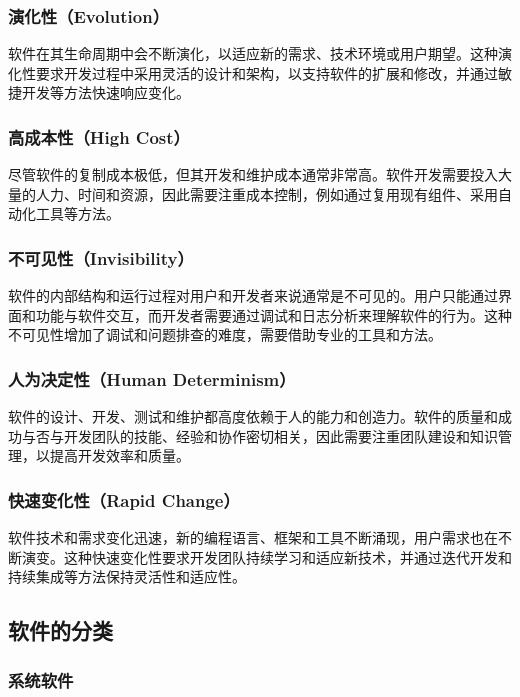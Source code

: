\subsubsection{演化性（Evolution）}

软件在其生命周期中会不断演化，以适应新的需求、技术环境或用户期望。这种演化性要求开发过程中采用灵活的设计和架构，以支持软件的扩展和修改，并通过敏捷开发等方法快速响应变化。

\subsubsection{高成本性（High Cost）}

尽管软件的复制成本极低，但其开发和维护成本通常非常高。软件开发需要投入大量的人力、时间和资源，因此需要注重成本控制，例如通过复用现有组件、采用自动化工具等方法。

\subsubsection{不可见性（Invisibility）}

软件的内部结构和运行过程对用户和开发者来说通常是不可见的。用户只能通过界面和功能与软件交互，而开发者需要通过调试和日志分析来理解软件的行为。这种不可见性增加了调试和问题排查的难度，需要借助专业的工具和方法。

\subsubsection{人为决定性（Human Determinism）}

软件的设计、开发、测试和维护都高度依赖于人的能力和创造力。软件的质量和成功与否与开发团队的技能、经验和协作密切相关，因此需要注重团队建设和知识管理，以提高开发效率和质量。

\subsubsection{快速变化性（Rapid Change）}

软件技术和需求变化迅速，新的编程语言、框架和工具不断涌现，用户需求也在不断演变。这种快速变化性要求开发团队持续学习和适应新技术，并通过迭代开发和持续集成等方法保持灵活性和适应性。

\subsection{软件的分类}

\subsubsection{系统软件}

